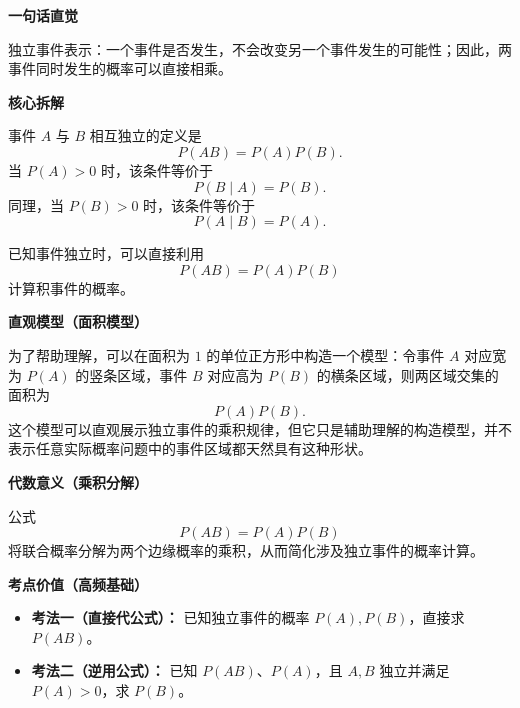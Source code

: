 \begin{explanationbox}

	\textbf{\textcolor{CExplanation}{一句话直觉}}

	独立事件表示：一个事件是否发生，不会改变另一个事件发生的可能性；因此，两事件同时发生的概率可以直接相乘。

	\medskip

	\textbf{\textcolor{CExplanation}{核心拆解}}

	\begin{description}[style=nextline, leftmargin=2.8em, labelsep=0.5em, itemsep=0.45em]
		\item[\textbf{要点一（独立性定义）：}]
		      事件 $A$ 与 $B$ 相互独立的定义是
		      \[
			      P(AB)=P(A)P(B).
		      \]
		      当 $P(A)>0$ 时，该条件等价于
		      \[
			      P(B\mid A)=P(B).
		      \]
		      同理，当 $P(B)>0$ 时，该条件等价于
		      \[
			      P(A\mid B)=P(A).
		      \]

		\item[\textbf{要点二（乘积应用）：}]
		      已知事件独立时，可以直接利用
		      \[
			      P(AB)=P(A)P(B)
		      \]
		      计算积事件的概率。
	\end{description}

	\medskip

	\textbf{\textcolor{CExplanation}{直观模型（面积模型）}}

	为了帮助理解，可以在面积为 $1$ 的单位正方形中构造一个模型：令事件 $A$ 对应宽为 $P(A)$ 的竖条区域，事件 $B$ 对应高为 $P(B)$ 的横条区域，则两区域交集的面积为
	\[
		P(A)P(B).
	\]
	这个模型可以直观展示独立事件的乘积规律，但它只是辅助理解的构造模型，并不表示任意实际概率问题中的事件区域都天然具有这种形状。

	\medskip

	\textbf{\textcolor{CExplanation}{代数意义（乘积分解）}}

	公式
	\[
		P(AB)=P(A)P(B)
	\]
	将联合概率分解为两个边缘概率的乘积，从而简化涉及独立事件的概率计算。

	\medskip

	\textbf{\textcolor{CExplanation}{考点价值（高频基础）}}

	\begin{itemize}[leftmargin=*, itemsep=0.5em, topsep=0.4em]
		\item \textbf{考法一（直接代公式）：}
		      已知独立事件的概率 $P(A),P(B)$，直接求 $P(AB)$。

		\item \textbf{考法二（逆用公式）：}
		      已知 $P(AB)$、$P(A)$，且 $A,B$ 独立并满足 $P(A)>0$，求 $P(B)$。
	\end{itemize}


\end{explanationbox}
